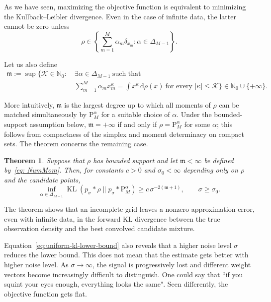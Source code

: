 \documentclass[12pt]{iopart}
\providecommand{\diff}{\mathrm{d}}
\newtheorem{thm}{Theorem}
\theoremstyle{remark}
\begin{document}
As we have seen, maximizing the objective function is equivalent to minimizing the Kullback--Leibler divergence. Even in the case of infinite data, 
the latter cannot be zero unless 
\[
\rho \in \left\{\sum_{m=1}^M \alpha_m \delta_{x_m} : \alpha \in \Delta_{M-1}\right\}.
\]

 Let us also define
\begin{equation}
\label{eq: NumMom}
\begin{aligned}
\mathfrak m:=\sup\bigg\{\mathcal K\in\mathbb N_0:\ &
\exists\alpha\in\Delta_{M-1}\ \text{such that}\\[-2pt]
&\sum_{m=1}^M\alpha_m x_m^\kappa
=\int x^\kappa\,\diff\rho(x)
\ \text{for every }|\kappa|\leq\mathcal K
\bigg\}\in\mathbb N_0\cup\{+\infty\}.
\end{aligned}
\end{equation}

More intuitively, $\mathfrak m$ is the largest degree up to which all moments of $\rho$ can be matched simultaneously by $\mathrm P_M^\alpha$ for a suitable choice of $\alpha$.
Under the bounded-support assumption below, $\mathfrak m=+\infty$ if
and only if $\rho=\mathrm P_M^\alpha$ for some $\alpha$; this follows from
compactness of the simplex and moment determinacy on compact sets. The
theorem concerns the remaining case.





\begin{thm}
\label{thm: LowBd}
Suppose that $\rho$ has bounded support and let $\mathfrak m<\infty$ be
defined by~\eqref{eq: NumMom}. Then, for constants $c>0$ and
$\sigma_0<\infty$ depending only on $\rho$ and the candidate points,
\begin{equation}
\label{eq:uniform-kl-lower-bound}
\inf_{\alpha\in\Delta_{M-1}}
\operatorname{KL}(p_\sigma*\rho\|p_\sigma*\mathrm P_M^\alpha)
\geq
c\,\sigma^{-2(\mathfrak m+1)},
\qquad \sigma\geq\sigma_0.
\end{equation}
\end{thm}




 
The theorem shows that an incomplete grid leaves a nonzero approximation
error, even with infinite data, in the forward KL divergence between the true
observation density and the best convolved candidate mixture.


 Equation~\eqref{eq:uniform-kl-lower-bound} also reveals that a higher noise level $\sigma$ reduces the lower bound. This does not mean that the estimate gets better with higher noise level. As $\sigma\to\infty$, the signal is progressively lost and different weight vectors become increasingly difficult to distinguish.
One could say that ``if you squint your eyes enough, everything looks the same". Seen differently, the objective function gets flat.
\end{document}

